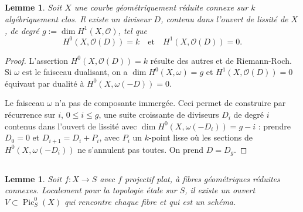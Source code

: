 \documentclass[12pt,a4paper]{article}
\theoremstyle{plain}
\newtheorem{lemma}[theorem]{Lemme}
\theoremstyle{definition}
\theoremstyle{remark}
\DeclareMathOperator{\Pic}{Pic}
\newcommand{\cO}{\mathcal{O}}
\begin{document}
\subsection{}\label{sec:4.4}

\begin{lemma}
Soit $X$ une courbe géométriquement réduite connexe sur $k$ algébriquement clos. Il existe un diviseur $D$, contenu dans l'ouvert de lissité de $X$, de degré $g := \dim H^1(X, \cO)$, tel que
\[
H^0(X, \cO(D)) = k \quad \text{et} \quad H^1(X, \cO(D)) = 0.
\]
\end{lemma}

\begin{proof}
L'assertion $H^0(X, \cO(D)) = k$ résulte des autres et de Riemann-Roch. Si $\omega$ est le faisceau dualisant, on a $\dim H^0(X, \omega) = g$ et $H^1(X, \cO(D)) = 0$ équivaut par dualité à $H^0(X, \omega(-D)) = 0$.

Le faisceau $\omega$ n'a pas de composante immergée. Ceci permet de construire par récurrence sur $i$, $0 \leq i \leq g$, une suite croissante de diviseurs $D_i$ de degré $i$ contenus dans l'ouvert de lissité avec $\dim H^0(X, \omega(-D_i)) = g-i$ : prendre $D_0 = 0$ et $D_{i+1} = D_i + P_i$, avec $P_i$ un $k$-point lisse où les sections de $H^0(X, \omega(-D_i))$ ne s'annulent pas toutes. On prend $D = D_g$.
\end{proof}

\subsection{}\label{sec:4.5}

\begin{lemma}
Soit $f : X \to S$ avec $f$ projectif plat, à fibres géométriques réduites connexes. Localement pour la topologie étale sur $S$, il existe un ouvert $V \subset \Pic_S^0(X)$ qui rencontre chaque fibre et qui est un schéma.
\end{lemma}
\end{document}
